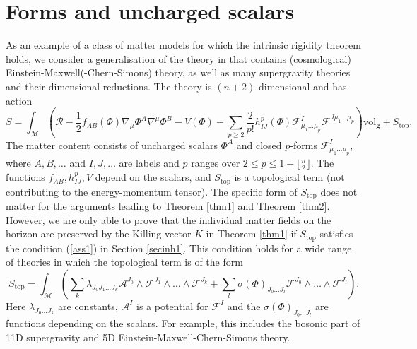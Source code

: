 \documentclass[11pt, reqno]{amsart}
\theoremstyle{plain}
\theoremstyle{definition}
\numberwithin{equation}{section}
\def\be{\begin{equation}}
\def\ee{\end{equation}}
\begin{document}
\section{Forms and uncharged scalars} \label{fsec}

As an example of a class of matter models for which the intrinsic rigidity theorem holds, we consider a generalisation of the theory in \cite{KLR} that contains (cosmological) Einstein-Maxwell(-Chern-Simons) theory, as well as many supergravity theories and their dimensional reductions. The theory is $(n+2)$-dimensional and has action 
\be \label{s1}
    S = \int_\mathcal{M} \left(\mathcal{R} - \frac 12f_{AB}(\Phi)\nabla_\mu\Phi^A\nabla^\mu \Phi^B - V(\Phi) - \sum_{p\geq 2} \frac{2}{p!}h_{IJ}^p(\Phi)\mathcal{F}_{\mu_1\dots\mu_p}^I\mathcal{F}^{J\mu_1\dots\mu_p}\right)\text{vol}_{\textbf{g}} + S_{\text{top}}. 
\ee
The matter content consists of uncharged scalars $\Phi^A$ and closed $p$-forms $\mathcal{F}_{\mu_1\dots\mu_p}^I$, where $A,B, \dots$ and $I,J,\dots$ are labels and $p$ ranges over $2\leq p \leq 1 + \lfloor \frac n2 \rfloor$. The functions $f_{AB}, h^p_{IJ}, V$ depend on the scalars, and $S_{\text{top}}$ is a topological term (not contributing to the energy-momentum tensor). The specific form of $S_{\text{top}}$ does not matter for the arguments leading to Theorem \ref{thm1} and Theorem \ref{thm2}. However, we are only able to prove that the individual matter fields on the horizon are preserved by the Killing vector $K$ in Theorem \ref{thm1} if $S_{\text{top}}$ satisfies the condition (\ref{ass1}) in Section \ref{secinh1}. This condition holds for a wide range of theories in which the topological term is of the form
\begin{equation} \label{OI}
    S_{\text{top}} = \int_{\mathcal{M}}\left(\sum_k \lambda_{J_0J_1\dots J_{k}}\mathcal{A}^{J_0} \wedge \mathcal{F}^{J_1}\wedge \dots \wedge \mathcal{F}^{J_k} + \sum_l\sigma(\Phi)_{J_0\dots J_l}  \mathcal{F}^{J_0}\wedge \dots\wedge \mathcal{F}^{J_l}\right).
\end{equation}
Here $\lambda_{J_0\dots J_{k}}$ are constants, $\mathcal{A}^I$ is a potential for $\mathcal{F}^I$ and the $\sigma(\Phi)_{J_0\dots J_l}$ are functions depending on the scalars. For example, this includes the bosonic part of 11D supergravity and 5D Einstein-Maxwell-Chern-Simons theory.
\end{document}
